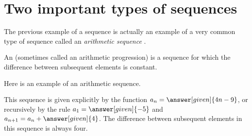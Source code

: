 \documentclass{ximera}
\begin{document}
%  
%  
  
  
  
  










\section{Two important types of sequences}

The previous example of a sequence is actually an example of a very common type of sequence called an \emph{arithmetic sequence} .  

\begin{definition}
  An  (sometimes called an arithmetic
  progression) is a sequence for which the
  difference between subsequent elements is constant.
\end{definition}


\begin{example}
  Here is an example of an arithmetic sequence.
  \begin{image}
  \end{image}
  This sequence is given explicitly by the function $a_n=\answer[given]{4n-9}$,
  or recursively by the rule $a_1 = \answer[given]{-5}$ and $a_{n+1} = a_n
  + \answer[given]{4}$. The difference between subsequent elements in this sequence is always four.
\end{example}
\end{document}
